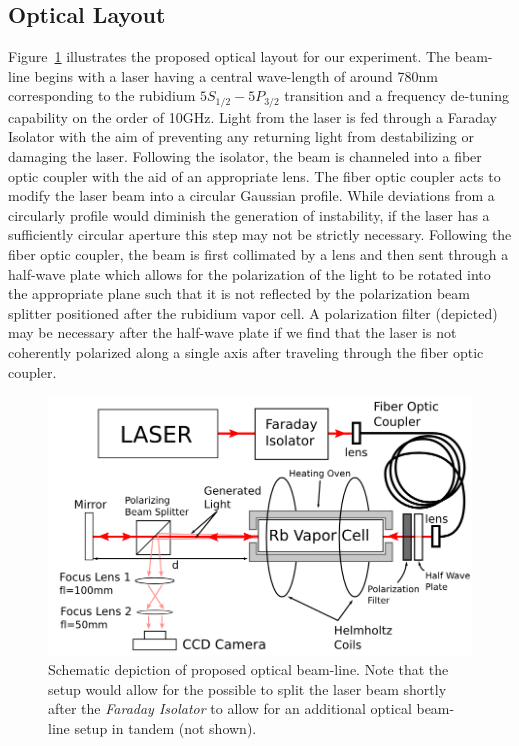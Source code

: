 \documentclass[aps,twocolumn,secnumarabic,balancelastpage,amsmath,amssymb,nofootinbib]{revtex4}
\begin{document}
\subsection*{Optical Layout}
Figure~\ref{fig:layout} illustrates the proposed optical layout for our experiment. The beam-line begins with a laser having a central wave-length of around 780nm corresponding to the rubidium $5S_{1/2}-5P_{3/2}$ transition and a frequency de-tuning capability on the order of 10GHz. Light from the laser is fed through a Faraday Isolator with the aim of preventing any returning light from destabilizing or damaging the laser. Following the isolator, the beam is channeled into a fiber optic coupler with the aid of an appropriate lens. The fiber optic coupler acts to modify the laser beam into a circular Gaussian profile. While deviations from a circularly profile would diminish the generation of instability, if the laser has a sufficiently circular aperture this step may not be strictly necessary. Following the fiber optic coupler, the beam is first collimated by a lens and then sent through a half-wave plate which allows for the polarization of the light to be rotated into the appropriate plane such that it is not reflected by the polarization beam splitter positioned after the rubidium vapor cell. A polarization filter (depicted) may be necessary after the half-wave plate if we find that the laser is not coherently polarized along a single axis after traveling through the fiber optic coupler. 

\begin{figure}[h!]
\includegraphics[width=0.9\linewidth]{drawing.png}
\caption{\label{fig:layout} Schematic depiction of proposed optical beam-line. Note that the setup would allow for the possible to split the laser beam shortly after the \textit{Faraday Isolator} to allow for an additional optical beam-line setup in tandem (not shown).}
\end{figure}
\end{document}
